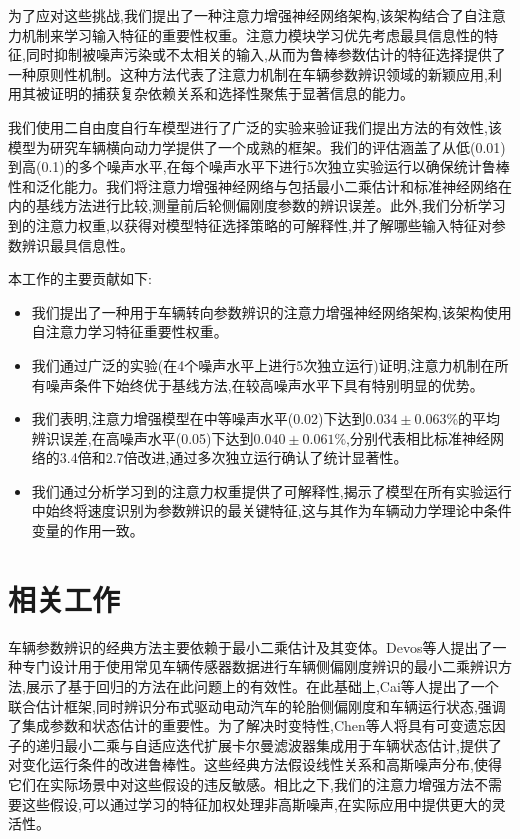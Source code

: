 \documentclass[Afour,sageh,times]{sagej}
\begin{document}
为了应对这些挑战,我们提出了一种注意力增强神经网络架构,该架构结合了自注意力机制来学习输入特征的重要性权重。注意力模块学习优先考虑最具信息性的特征,同时抑制被噪声污染或不太相关的输入,从而为鲁棒参数估计的特征选择提供了一种原则性机制。这种方法代表了注意力机制在车辆参数辨识领域的新颖应用,利用其被证明的捕获复杂依赖关系和选择性聚焦于显著信息的能力。

我们使用二自由度自行车模型进行了广泛的实验来验证我们提出方法的有效性,该模型为研究车辆横向动力学提供了一个成熟的框架。我们的评估涵盖了从低(0.01)到高(0.1)的多个噪声水平,在每个噪声水平下进行5次独立实验运行以确保统计鲁棒性和泛化能力。我们将注意力增强神经网络与包括最小二乘估计和标准神经网络在内的基线方法进行比较,测量前后轮侧偏刚度参数的辨识误差。此外,我们分析学习到的注意力权重,以获得对模型特征选择策略的可解释性,并了解哪些输入特征对参数辨识最具信息性。

本工作的主要贡献如下:
\begin{itemize}
    \item 我们提出了一种用于车辆转向参数辨识的注意力增强神经网络架构,该架构使用自注意力学习特征重要性权重。
    \item 我们通过广泛的实验(在4个噪声水平上进行5次独立运行)证明,注意力机制在所有噪声条件下始终优于基线方法,在较高噪声水平下具有特别明显的优势。
    \item 我们表明,注意力增强模型在中等噪声水平(0.02)下达到$0.034 \pm 0.063$\%的平均辨识误差,在高噪声水平(0.05)下达到$0.040 \pm 0.061$\%,分别代表相比标准神经网络的3.4倍和2.7倍改进,通过多次独立运行确认了统计显著性。
    \item 我们通过分析学习到的注意力权重提供了可解释性,揭示了模型在所有实验运行中始终将速度识别为参数辨识的最关键特征,这与其作为车辆动力学理论中条件变量的作用一致。
\end{itemize}

\section{相关工作}
\label{sec:related}

车辆参数辨识的经典方法主要依赖于最小二乘估计及其变体。Devos等人\citep{Devos2024ALI}提出了一种专门设计用于使用常见车辆传感器数据进行车辆侧偏刚度辨识的最小二乘辨识方法,展示了基于回归的方法在此问题上的有效性。在此基础上,Cai等人\citep{Cai2025JointEO}提出了一个联合估计框架,同时辨识分布式驱动电动汽车的轮胎侧偏刚度和车辆运行状态,强调了集成参数和状态估计的重要性。为了解决时变特性,Chen等人\citep{Chen2024VehicleSE}将具有可变遗忘因子的递归最小二乘与自适应迭代扩展卡尔曼滤波器集成用于车辆状态估计,提供了对变化运行条件的改进鲁棒性。这些经典方法假设线性关系和高斯噪声分布,使得它们在实际场景中对这些假设的违反敏感。相比之下,我们的注意力增强方法不需要这些假设,可以通过学习的特征加权处理非高斯噪声,在实际应用中提供更大的灵活性。
\end{document}
